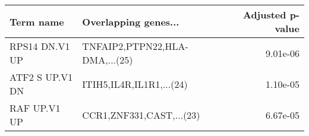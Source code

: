 \begin{tabular}{llr}
\toprule
      Term name &           Overlapping genes... &  Adjusted p-value \\
\midrule
 RPS14 DN.V1 UP & TNFAIP2,PTPN22,HLA-DMA,...(25) &          9.01e-06 \\
ATF2 S UP.V1 DN &       ITIH5,IL4R,IL1R1,...(24) &          1.10e-05 \\
   RAF UP.V1 UP &       CCR1,ZNF331,CAST,...(23) &          6.67e-05 \\
\bottomrule
\end{tabular}
